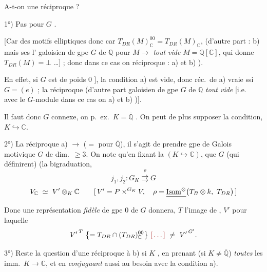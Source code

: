 \documentclass[11pt,a4paper]{article}
\begin{document}
A-t-on une réciproque ?

1°) Pas pour   \struck{\ill{}}
 \ill{} $G$ \ill{}.

[Car des motifs elliptiques \ill{} \ill{} donc car
$T_{DR}(M)^{00}_{\mathbb{C}} = T_{DR}(M)_{\mathbb{C}}$, (d'autre part
\ill{} : b) \ill{} mais ses l'\ill{} \ill{} galoisien \ill{} de gpe $G$ de
$\mathbb{Q}$ \ill{} pour $M \to$ \emph{tout vide} \ill{}
$M = \mathbb{Q}[\mathbb{C}]$, qui donne $T_{DR}(M) = \bot$ …] ; donc dans ce cas
on \ill{} réciproque : a) et b) ).

En effet, si $G$ est \struck{\ill{}} \ill{} de poids $0$ ], la condition a) est
vide, donc réc.\ de a) vraie ssi $G = (e)$ ;  la réciproque
\ill{} (d'autre part \ill{} galoisien \ill{} de gpe $G$ de $\mathbb{Q}$ \ill{}
\emph{tout vide} [i.e.\ \ill{} avec le $G$-module \ill{} dans ce cas on
\ill{} a) et b) )].

Il faut donc \ill{} \ill{} $G$ connexe, on \ill{} p.\ ex.\ $K = \overline{\mathbb{Q}}$
\ill{} \ill{}. On peut de plus supposer la condition, \ill{} 
$K \hookrightarrow \mathbb{C}$.

2°) La réciproque \ill{} a) $\to$ \ill{} \ill{} \ill{} ($=$ pour
$\overline{\mathbb{Q}}$), il s'agit de prendre \ill{} \ill{} gpe de Galois
motivique $G$ \ill{} de dim.\ $\geqslant 3$. On note qu'en \ill{} fixant la
$(K \hookrightarrow \mathbb{C})$, \ill{} \ill{} que $G$
 (qui définirent) (la bigraduation,
\[ j_{1}, j_{2} : G_{K} \overset{\rho}{\rightrightarrows} G \]
\[ V_{\mathbb{C}} \ \simeq \ V' \otimes_{K} \mathbb{C} \qquad
[\, V' = P \times^{G_{K}} V, \quad
\rho = \struck{\underline{\operatorname{Isom}}^{\otimes}} \bigl( T_{B} \otimes k,\ T_{DR} \bigr) \,] \]
Donc une représentation \emph{fidèle} de gpe \ill{} $0$ de $G$ donnera,
\struck{\ill{}} $T$ l'image de ,
\ill{} $V'$ \ill{} pour laquelle
\[ {V'}^{\,T} \ \bigl\{ = T_{DR} \cap (T_{DR})^{00}_{\mathbb{C}} \bigr\}
\ \ill{} \ \neq \ {V'}^{\,G'} . \]



3°) Reste la question d'une réciproque à b) si $K$ \ill{}, en prenant
 (si $K \neq \overline{\mathbb{Q}}$) \emph{toutes} les
imm.\ $K \to \mathbb{C}$, et en \emph{conjuguant} aussi au besoin avec la condition a).

\end{document}
